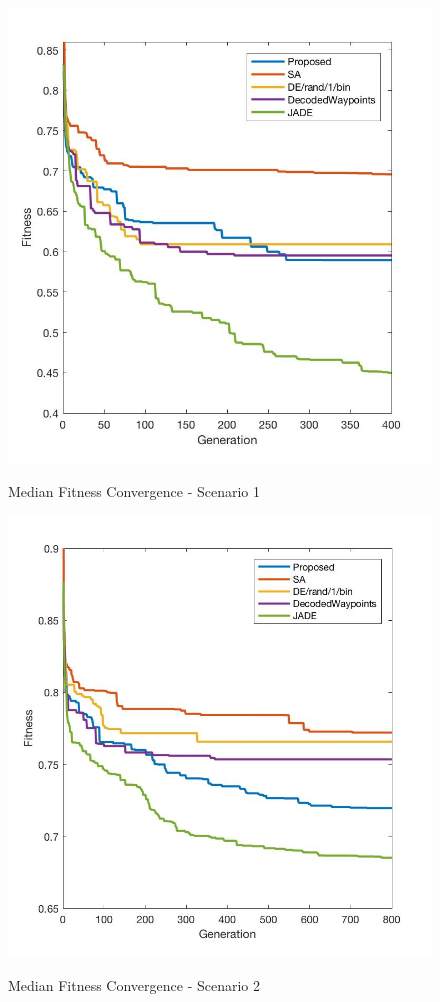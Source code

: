 \documentclass[10pt,a4paper, oneside, conference]{IEEEtran}
\begin{document}
\begin{figure}[H]
	\caption{Median Fitness Convergence - Scenario 1}
	\centering
	\includegraphics[width=0.7\linewidth]{scenario1Plot.jpg}
	\label{fig:medianPlot1}	
	\end{figure}
	
		\begin{figure}[H]
	\caption{Median Fitness Convergence - Scenario 2}
	\centering
	\includegraphics[width=0.7\linewidth]{scenario2Plot.jpg}
	\label{fig:medianPlot2}	
	\end{figure}
	
\end{document}
